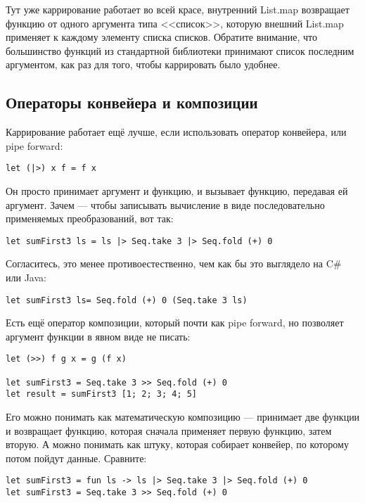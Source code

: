 \documentclass{../../text-style}
\begin{document}
Тут уже каррирование работает во всей красе, внутренний List.map возвращает функцию от одного аргумента типа <<список>>, которую внешний List.map применяет к каждому элементу списка списков. Обратите внимание, что большинство функций из стандартной библиотеки принимают список последним аргументом, как раз для того, чтобы каррировать было удобнее.

\subsection{Операторы конвейера и композиции}

Каррирование работает ещё лучше, если использовать оператор конвейера, или pipe forward:

\begin{verbatim}
let (|>) x f = f x
\end{verbatim}

Он просто принимает аргумент и функцию, и вызывает функцию, передавая ей аргумент. Зачем --- чтобы записывать вычисление в виде последовательно применяемых преобразований, вот так:

\begin{verbatim}
let sumFirst3 ls = ls |> Seq.take 3 |> Seq.fold (+) 0
\end{verbatim}

Согласитесь, это менее противоестественно, чем как бы это выглядело на C\# или Java:

\begin{verbatim}
let sumFirst3 ls= Seq.fold (+) 0 (Seq.take 3 ls)
\end{verbatim}

Есть ещё оператор композиции, который почти как pipe forward, но позволяет аргумент функции в явном виде не писать:

\begin{verbatim}
let (>>) f g x = g (f x)

let sumFirst3 = Seq.take 3 >> Seq.fold (+) 0
let result = sumFirst3 [1; 2; 3; 4; 5]
\end{verbatim}

Его можно понимать как математическую композицию --- принимает две функции и возвращает функцию, которая сначала применяет первую функцию, затем вторую. А можно понимать как штуку, которая собирает конвейер, по которому потом пойдут данные. Сравните: 

\begin{verbatim}
let sumFirst3 = fun ls -> ls |> Seq.take 3 |> Seq.fold (+) 0
let sumFirst3 = Seq.take 3 >> Seq.fold (+) 0
\end{verbatim}
\end{document}
